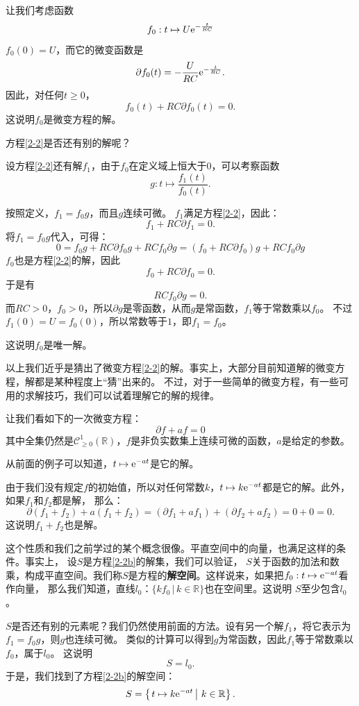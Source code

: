 \documentclass[12pt,UTF8]{ctexbook}
\begin{document}
让我们考虑函数
$$f_0: t\mapsto U\mathrm{e}^{-\frac{t}{RC}}$$
$f_0(0) = U$，而它的微变函数是
$$\partial f_0(t) = -\frac{U}{RC} \mathrm{e}^{-\frac{t}{RC}}. $$
因此，对任何$t\geqslant 0$，
$$ f_0(t) + RC\partial f_0(t) = 0.$$
这说明$f_0$是微变方程的解。

方程\eqref{2-2}是否还有别的解呢？

设方程\eqref{2-2}还有解$f_1$，由于$f_0$在定义域上恒大于$0$，可以考察函数
$$ g : t \mapsto \frac{f_1(t)}{f_0(t)}. $$

按照定义，$f_1 = f_0 g$，而且$g$连续可微。
$f_1$满足方程\eqref{2-2}，因此：
$$ f_1 + RC \partial f_1 = 0.$$
将$f_1 = f_0 g$代入，可得：
$$ 0 = f_0 g + RC \partial f_0 g + RC f_0 \partial g = (f_0 + RC \partial f_0) g + RC f_0 \partial g $$
$f_0$也是方程\eqref{2-2}的解，因此
$$ f_0 + RC\partial f_0 = 0.$$
于是有
$$ RC f_0 \partial g = 0. $$
而$RC>0$，$f_0>0$，所以$\partial g$是零函数，从而$g$是常函数，$f_1$等于常数乘以$f_0$。
不过$f_1(0) = U = f_0(0)$，所以常数等于$1$，即$f_1 = f_0$。

这说明$f_0$是唯一解。

以上我们近乎是猜出了微变方程\eqref{2-2}的解。事实上，大部分目前知道解的微变方程，解都是某种程度上“猜”出来的。
不过，对于一些简单的微变方程，有一些可用的求解技巧，我们可以试着理解它的解的规律。

让我们看如下的一次微变方程：
\begin{equation}
    \partial f + af = 0 \label{2-2b}
\end{equation}
其中全集仍然是$\mathcal{C}^1_{\geqslant 0}(\mathbb{R})$，$f$是非负实数集上连续可微的函数，$a$是给定的参数。

从前面的例子可以知道，$t\mapsto \mathrm{e}^{-at}$是它的解。

由于我们没有规定$f$的初始值，所以对任何常数$k$，$t\mapsto k\mathrm{e}^{-at}$都是它的解。此外，如果$f_1$和$f_2$都是解，
那么：
$$ \partial (f_1 + f_2) + a(f_1 + f_2) = (\partial f_1 + af_1) + (\partial f_2 + af_2) = 0 + 0 = 0. $$
这说明$f_1 + f_2$也是解。

这个性质和我们之前学过的某个概念很像。平直空间中的向量，也满足这样的条件。事实上，
设$S$是方程\eqref{2-2b}的解集，我们可以验证，
$S$关于函数的加法和数乘，构成平直空间。我们称$S$是方程的\textbf{解空间}。这样说来，如果把$f_0:t\mapsto \mathrm{e}^{-at}$看作向量，
那么我们知道，直线$l_0$：$\{kf_0 \, | \, k\in\mathbb{R}\}$也在空间里。这说明
$S$至少包含$l_0$。

$S$是否还有别的元素呢？我们仍然使用前面的方法。设有另一个解$f_1$，将它表示为$f_1 = f_0 g$，则$g$也连续可微。
类似的计算可以得到$g$为常函数，因此$f_1$等于常数乘以$f_0$，属于$l_0$。
这说明
$$S = l_0.$$
于是，我们找到了方程\eqref{2-2b}的解空间：
$$S = \left\{\left.t\mapsto k\mathrm{e}^{-at} \, \right| \, k\in\mathbb{R}\right\}.$$
\end{document}
